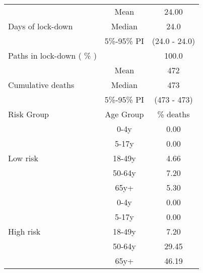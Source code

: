 \documentclass{article}
\begin{document}
\begin{table}[th]
\centering
\begin{tabular}{p{4cm}cc}
\toprule
\multirow{3}{*}{Days   of lock-down} & Mean      & 24.00                        \\ \cmidrule(l){2-3} 
                                     & Median    & 24.0                      \\ \cmidrule(l){2-3} 
                                     & 5\%-95\% PI & (24.0 - 24.0)       \\ \midrule 
\multirow{1}{*}{Paths in lock-down ( \% )} &      &         100.0              \\   \midrule                     
\multirow{3}{\hsize}{Cumulative deaths}       & Mean      & 472 \\ \cmidrule(l){2-3} 
                                     & Median    & 473                        \\ \cmidrule(l){2-3} 
                                     & 5\%-95\% PI & (473 - 473)           \\  \midrule
Risk Group                           & Age Group & \multicolumn{1}{c}{\% deaths}        \\  \midrule
\multirow{5}{*}{Low   risk}          & 0-4y      & 0.00                         \\ \cmidrule(l){2-3} 
                                     & 5-17y     & 0.00                         \\ \cmidrule(l){2-3} 
                                     & 18-49y    & 4.66                         \\ \cmidrule(l){2-3} 
                                     & 50-64y    & 7.20                         \\ \cmidrule(l){2-3} 
                                     & 65y+      & 5.30                         \\ \midrule
\multirow{5}{*}{High   risk}         & 0-4y      & 0.00                         \\ \cmidrule(l){2-3} 
                                     & 5-17y     & 0.00                         \\ \cmidrule(l){2-3} 
                                     & 18-49y    & 7.20                         \\ \cmidrule(l){2-3} 
                                     & 50-64y    & 29.45                         \\ \cmidrule(l){2-3} 
                                     & 65y+      & 46.19                         \\ \midrule

\end{tabular}
\end{table}
\end{document}
